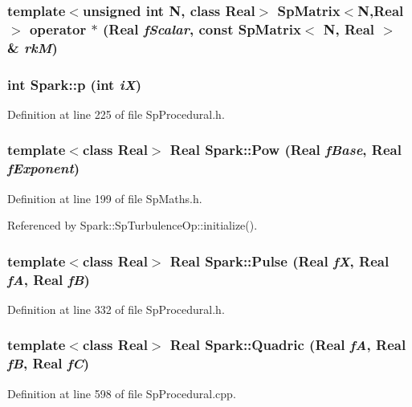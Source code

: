\subsubsection{\setlength{\rightskip}{0pt plus 5cm}template$<$unsigned int N, class Real$>$ {\bf Sp\-Matrix}$<$N,Real$>$ operator $\ast$ (Real {\em f\-Scalar}, const Sp\-Matrix$<$ N, Real $>$ \& {\em rk\-M})}\label{namespaceSpark_a69}


\subsubsection{\setlength{\rightskip}{0pt plus 5cm}int Spark::p (int {\em i\-X})\hspace{0.3cm}{\tt  [inline]}}\label{namespaceSpark_a91}


Definition at line 225 of file Sp\-Procedural.h.
\subsubsection{\setlength{\rightskip}{0pt plus 5cm}template$<$class Real$>$ Real Spark::Pow (Real {\em f\-Base}, Real {\em f\-Exponent})}\label{namespaceSpark_a47}


Definition at line 199 of file Sp\-Maths.h.

Referenced by Spark::Sp\-Turbulence\-Op::initialize().
\subsubsection{\setlength{\rightskip}{0pt plus 5cm}template$<$class Real$>$ Real Spark::Pulse (Real {\em f\-X}, Real {\em f\-A}, Real {\em f\-B})}\label{namespaceSpark_a103}


Definition at line 332 of file Sp\-Procedural.h.
\subsubsection{\setlength{\rightskip}{0pt plus 5cm}template$<$class Real$>$ Real Spark::Quadric (Real {\em f\-A}, Real {\em f\-B}, Real {\em f\-C})}\label{namespaceSpark_a71}


Definition at line 598 of file Sp\-Procedural.cpp.


